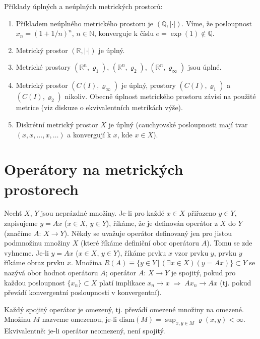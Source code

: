 \begin{ex} Příklady úplných a neúplných metrických prostorů:
   \begin{enumerate}
   \item Příkladem neúplného metrického prostoru je $(\mathbb{Q},|\cdot|)$.
         Víme, že posloupnost $x_n=(1+1/n)^n$, $n\in\mathbb{N}$,
         konverguje k číslu $e=\exp(1)\not\in\mathbb{Q}$.
   \item Metrický prostor $(\mathbb{R},|\cdot|)$ je úplný.
   \item Metrické prostory 
         $(\mathbb{R}^n,\varrho_1)$, $(\mathbb{R}^n,\varrho_2)$, 
         $(\mathbb{R}^n,\varrho_{\infty})$ jsou úplné.
   \item Metrický prostor $(C(I),\varrho_{\infty})$ je úplný,
         prostory $(C(I),\varrho_{1})$ a $(C(I),\varrho_{2})$ nikoliv.
         Obecně úplnost metrického prostoru závisí na použité metrice
         (viz diskuze o ekvivalentních metrikách výše).
   \item Diskrétní metrický prostor $X$ je úplný
         (cauchyovské posloupnosti mají tvar $(x,x,\ldots,x,\ldots)$
         a konvergují k $x$, kde $x\in X$).
   \end{enumerate}
\end{ex}

\section{Operátory na metrických prostorech}

Nechť $X$, $Y$ jsou neprázdné množiny.
Je-li pro každé $x\in X$ přiřazeno $y\in Y$, zapisujeme $y=Ax$ ($x\in X$, $y\in Y$),
říkáme, že je definován operátor z $X$ do $Y$ (značíme $A:\,X\rightarrow Y$).
Někdy se uvažuje operátor definovaný jen pro jistou podmnožinu množiny $X$
(které říkáme definiční obor operátoru $A$). Tomu se zde vyhneme.
Je-li $y=Ax$ ($x\in X$, $y\in Y$), říkáme prvku $x$ vzor prvku $y$,
prvku $y$ říkáme obraz prvku $x$.
Množina $R(A)\equiv\{y\in Y\,|\,(\exists x\in X)(y=Ax)\}\subset Y$
se nazývá obor hodnot operátoru $A$;
operátor $A:\,X\rightarrow Y$ je spojitý, pokud pro každou posloupnost
$\{x_n\}\subset X$ platí implikace $x_n\rightarrow x\;\Rightarrow\;Ax_n\rightarrow Ax$
(tj. pokud převádí konvergentní posloupnosti v konvergentní).

Každý spojitý operátor je omezený, tj. převádí omezené množiny na omezené.
Množinu $M$ nazveme omezenou, je-li 
$\mathrm{diam}(M)=\sup_{x,y\in M}\varrho(x,y)<\infty$.
Ekvivalentně: je-li operátor neomezený, není spojitý.

